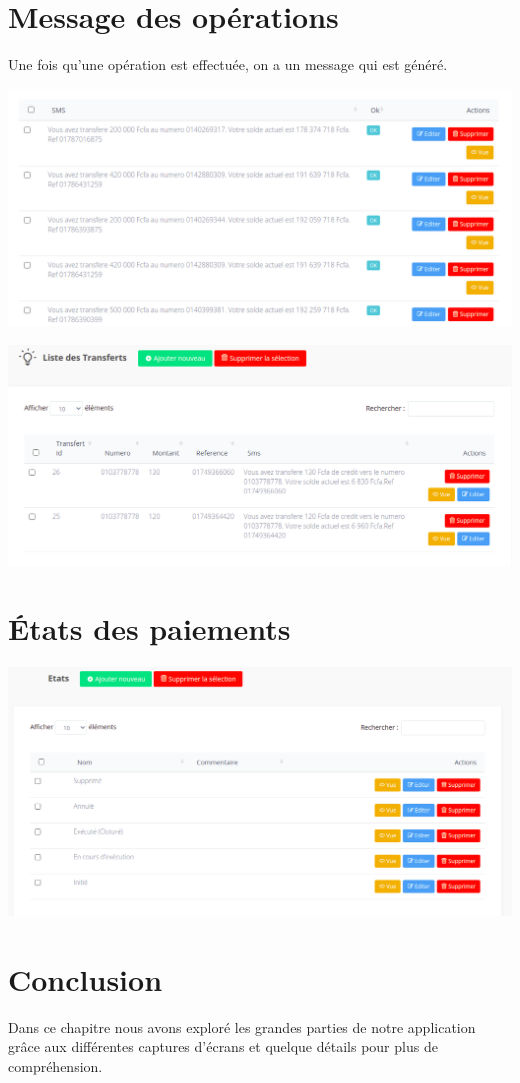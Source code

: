 	\section{Message des opérations}
		Une fois qu'une opération est effectuée, on a un message qui est généré.
		\begin{center}
			\includegraphics[scale=0.5]{chap_3/message_1.png}
			\label{message}
		\end{center}
		\begin{center}
			\includegraphics[scale=0.5]{chap_3/message_2.png}
			\label{message_transfert}
		\end{center}
	\section{États des paiements}
		\begin{center}
			\includegraphics[scale=0.5]{chap_3/etat_de_paiement.png}
			\label{etat_de_paiement}
		\end{center}
	\section{Conclusion}
		Dans ce chapitre nous avons exploré les grandes parties de notre application grâce aux différentes captures d'écrans et quelque détails pour plus de compréhension.